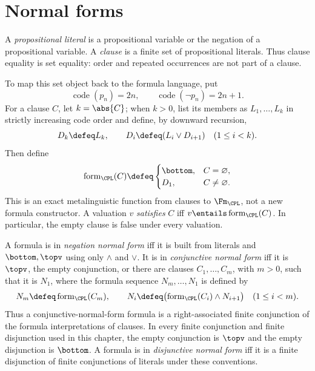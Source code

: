 \section{Normal forms}
\label{sec:prop-syntax-semantics-04}

\begin{definition}
A \emph{propositional literal} is a propositional variable or the negation of
a propositional variable.  A \emph{clause} is a finite set of propositional
literals.  Thus clause equality is set equality: order and repeated
occurrences are not part of a clause.

To map this set object back to the formula language, put
\[
 \operatorname{code}(p_n)=2n,
 \qquad
 \operatorname{code}(\neg p_n)=2n+1.
\]
For a clause \(C\), let \(k=\abs{C}\); when \(k>0\), list its members as
\(L_1,\ldots,L_k\) in strictly increasing code order and define, by downward
recursion,
\[
 D_k\defeq L_k,
 \qquad
 D_i\defeq(L_i\lor D_{i+1})\quad(1\leq i<k).
\]
Then define
\[
 \operatorname{form}_{\CPL}(C)\defeq
 \begin{cases}
  \bottom,&C=\varnothing,\\
  D_1,&C\ne\varnothing.
 \end{cases}
\]
This is an exact metalinguistic function from clauses to
\(\Fm_{\CPL}\), not a new formula constructor.  A valuation \(v\)
\emph{satisfies} \(C\) iff
\(v\entails\operatorname{form}_{\CPL}(C)\).  In particular, the empty
clause is false under every valuation.
\end{definition}

\begin{definition}
A formula is in \emph{negation normal form} iff it is built from literals and
\(\bottom,\topv\) using only \(\land\) and \(\lor\).  It is in
\emph{conjunctive normal form} iff it is \(\topv\), the empty conjunction,
or there are clauses \(C_1,\ldots,C_m\), with \(m>0\), such that it is
\(N_1\), where the formula sequence \(N_m,\ldots,N_1\) is defined by
\[
 N_m\defeq\operatorname{form}_{\CPL}(C_m),
 \qquad
 N_i\defeq
 \bigl(\operatorname{form}_{\CPL}(C_i)\land N_{i+1}\bigr)
 \quad(1\leq i<m).
\]
Thus a conjunctive-normal-form formula is a right-associated finite
conjunction of the formula interpretations of clauses.  In every finite
conjunction and finite disjunction used in this chapter, the empty conjunction
is \(\topv\) and the empty disjunction is \(\bottom\).  A formula is in
\emph{disjunctive normal form} iff it is a finite disjunction of finite
conjunctions of literals under these conventions.
\end{definition}

